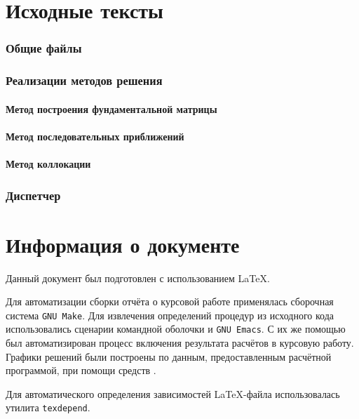 \documentclass{article}
\numberwithin{equation}{section}
\begin{document}
\clearpage
\appendix
\part{Исходные тексты}
\section{Общие файлы}




\clearpage
\section{Реализации методов решения}
\subsection{Метод построения  фундаментальной матрицы}



\clearpage
\subsection{Метод последовательных приближений}



\clearpage
\subsection{Метод коллокации}

\clearpage
\section{Диспетчер}



\clearpage
\part{Информация о документе}

Данный документ был подготовлен с использованием \LaTeX{}.

Для автоматизации сборки отчёта о курсовой работе применялась
сборочная система \texttt{GNU Make}. Для извлечения определений
процедур из исходного кода использовались сценарии командной оболочки
и \texttt{GNU Emacs}. С их же помощью был автоматизирован процесс
включения результата расчётов в курсовую работу. Графики решений были
построены по данным, предоставленным расчётной программой, при помощи
средств \MP.

Для автоматического определения зависимостей
\LaTeX{}-файла использовалась утилита \texttt{texdepend}.

\nocite{demidovich67}



\end{document}
